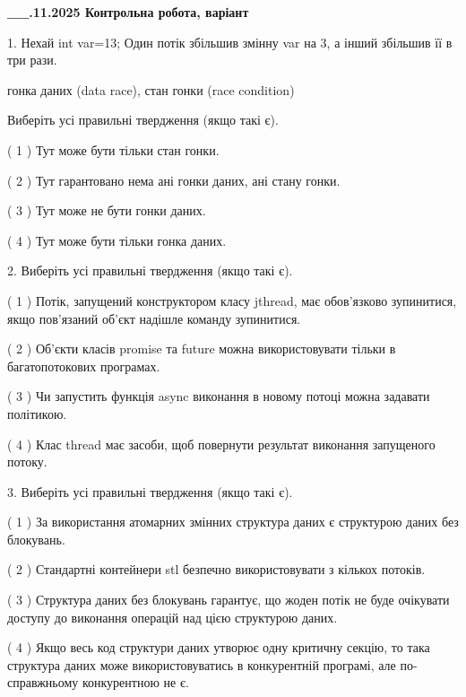 \documentclass[12pt, ukrainian]{article}
\begin{document}
\newpage
\begin {large}

\textbf{\_\_.11.2025 Контрольна робота, варіант  }\par


{
1. Нехай int var=13; Один потік збільшив змінну var на 3, а інший збільшив її в три рази.

гонка даних (data race), стан гонки (race condition)

Виберіть усі правильні твердження (якщо такі є).\par
\vspace{2mm}
( 1 ) Тут може бути тільки стан гонки.%

( 2 ) Тут гарантовано нема ані гонки даних, ані стану гонки.%

( 3 ) Тут може не бути гонки даних.%

( 4 ) Тут може бути тільки гонка даних.%


2. Виберіть усі правильні твердження (якщо такі є).\par
\vspace{2mm}

( 1 ) Потік, запущений конструктором класу jthread, має обов’язково зупинитися, якщо пов’язаний об’єкт надішле команду зупинитися.%

( 2 ) Об’єкти класів promise та future можна використовувати тільки в багатопотокових програмах.%

( 3 ) Чи запустить функція  async виконання в новому потоці можна задавати політикою.%

( 4 ) Клас thread має засоби, щоб повернути результат виконання запущеного потоку.%


3. Виберіть усі правильні твердження (якщо такі є).\par
\vspace{2mm}

( 1 ) За використання атомарних змінних структура даних є структурою даних без блокувань.%

( 2 ) Стандартні контейнери stl безпечно використовувати з кількох потоків.%

( 3 ) Структура даних без блокувань гарантує, що жоден потік не буде очікувати доступу до виконання операцій над цією структурою даних.%

( 4 ) Якщо весь код структури даних утворює одну критичну секцію, то така структура даних може використовуватись в конкурентній програмі, але по-справжньо\-му конкурентною не є.%


}
\end{large}
\end{document}
